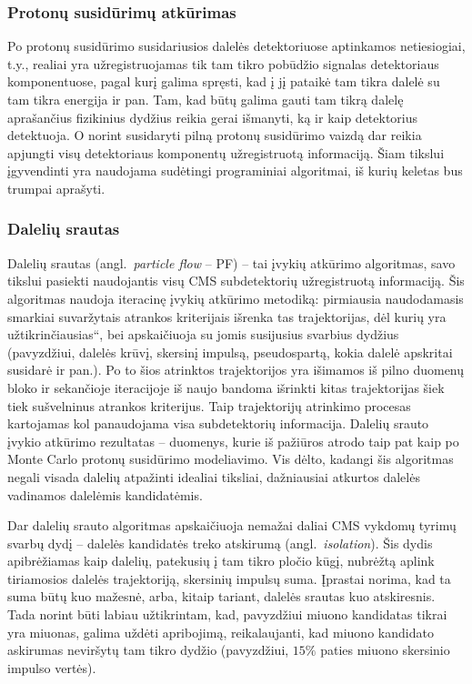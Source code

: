 \documentclass[a4paper, 12pt]{article}
\newcommand{\ltq}[1]{{\quotedblbase{}#1\textquotedblleft{}}}
\newlength\q
\begin{document}
\subsubsection{Protonų susidūrimų atkūrimas}\label{sec:ppReco}

Po protonų susidūrimo susidariusios dalelės detektoriuose aptinkamos netiesiogiai, t.y., realiai  yra
užregistruojamas tik tam tikro pobūdžio signalas detektoriaus komponentuose, pagal kurį galima spręsti,
kad į jį pataikė tam tikra dalelė su tam tikra energija ir pan.
Tam, kad būtų galima gauti tam tikrą dalelę aprašančius fizikinius dydžius reikia gerai išmanyti, ką
ir kaip detektorius detektuoja.
O norint susidaryti pilną protonų susidūrimo vaizdą dar reikia apjungti visų detektoriaus komponentų
užregistruotą informaciją.
Šiam tikslui įgyvendinti yra naudojama sudėtingi programiniai algoritmai, iš kurių keletas bus trumpai
aprašyti.


\subsubsection*{Dalelių srautas}

Dalelių srautas (angl.\ \textit{particle flow} -- PF) -- tai įvykių atkūrimo algoritmas, savo tikslui pasiekti
naudojantis visų CMS subdetektorių užregistruotą informaciją.
Šis algoritmas naudoja iteracinę įvykių atkūrimo metodiką: pirmiausia naudodamasis smarkiai suvaržytais
atrankos kriterijais išrenka tas trajektorijas, dėl kurių yra \ltq{užtikrinčiausias}, bei apskaičiuoja
su jomis susijusius svarbius dydžius (pavyzdžiui, dalelės krūvį, skersinį impulsą, pseudospartą,
kokia dalelė apskritai susidarė ir pan.).
Po to šios atrinktos trajektorijos yra išimamos iš pilno duomenų bloko ir sekančioje iteracijoje iš
naujo bandoma išrinkti kitas trajektorijas šiek tiek sušvelninus atrankos kriterijus.
Taip trajektorijų atrinkimo procesas kartojamas kol panaudojama visa subdetektorių informacija.
Dalelių srauto įvykio atkūrimo rezultatas -- duomenys, kurie iš pažiūros atrodo taip pat kaip po
Monte Carlo protonų susidūrimo modeliavimo.
Vis dėlto, kadangi šis algoritmas negali visada dalelių atpažinti idealiai tiksliai, dažniausiai
atkurtos dalelės vadinamos dalelėmis kandidatėmis.

Dar dalelių srauto algoritmas apskaičiuoja nemažai daliai CMS vykdomų tyrimų svarbų dydį -- dalelės
kandidatės treko atskirumą (angl.\ \textit{isolation}).
Šis dydis apibrėžiamas kaip dalelių, patekusių į tam tikro pločio kūgį, nubrėžtą aplink tiriamosios
dalelės trajektoriją, skersinių impulsų suma.
Įprastai norima, kad ta suma būtų kuo mažesnė, arba, kitaip tariant, dalelės srautas kuo atskiresnis.
Tada norint būti labiau užtikrintam, kad, pavyzdžiui miuono kandidatas tikrai yra miuonas, galima
uždėti apribojimą, reikalaujanti, kad miuono kandidato askirumas neviršytų tam tikro dydžio
(pavyzdžiui, $15\%$ paties miuono skersinio impulso vertės).
\end{document}
